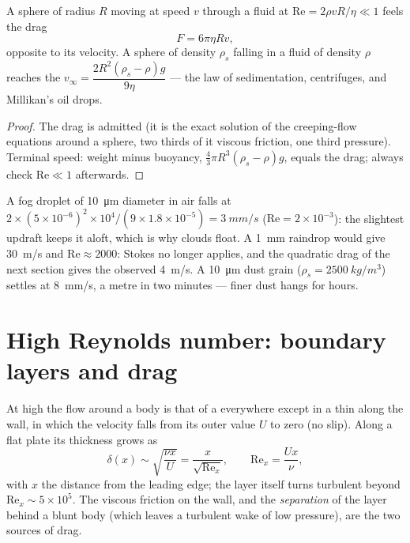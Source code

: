 \begin{proposition}\label{prop:b2:viscous-flows:stokes}
A sphere of radius $R$ moving at speed $v$ through a fluid at
$\mathrm{Re} = 2\rho vR/\eta \ll 1$ feels the drag
\[
F = 6\pi\eta Rv ,
\]
opposite to its velocity. A sphere of density $\rho_s$ falling in a fluid
of density $\rho$ reaches the \emph{} $v_\infty =
\dfrac{2R^2(\rho_s - \rho)g}{9\eta}$ --- the law of sedimentation,
centrifuges, and Millikan's oil drops.
\end{proposition}

\begin{proof}
The drag is admitted (it is the exact solution of the creeping-flow
equations around a sphere, two thirds of it viscous friction, one third
pressure). Terminal speed: weight minus buoyancy, $\tfrac43\pi R^3(\rho_s -
\rho)g$, equals the drag; always check $\mathrm{Re} \ll 1$ afterwards.
\end{proof}

\begin{example}\label{ex:b2:viscous-flows:fog}
A fog droplet of \qty{10}{\micro m} diameter in air falls at $2 \times (5 \times
10^{-6})^2 \times 10^4/(9 \times 1.8 \times 10^{-5}) = \qty{3}{mm/s}$ ($\mathrm{Re} = 2 \times
10^{-3}$): the slightest updraft keeps it aloft, which is why clouds
float. A \qty{1}{mm} raindrop would give \qty{30}{m/s} and $\mathrm{Re} \approx 2000$:
Stokes no longer applies, and the quadratic drag of the next section
gives the observed \qty{4}{m/s}. A \qty{10}{\micro m} dust grain ($\rho_s =
\qty{2500}{kg/m^3}$) settles at \qty{8}{mm/s}, a metre in two minutes ---
finer dust hangs for hours.
\end{example}

\section{High Reynolds number: boundary layers and drag}

\begin{proposition}\label{prop:b2:viscous-flows:bl}
At high  the flow around a body is that of a  everywhere except in a thin \emph{} along the wall,
in which the velocity falls from its outer value $U$ to zero (no slip).
Along a flat plate its thickness grows as
\[
\delta(x) \sim \sqrt{\frac{\nu x}{U}} = \frac{x}{\sqrt{\mathrm{Re}_x}} ,
\qquad \mathrm{Re}_x = \frac{Ux}{\nu} ,
\]
with $x$ the distance from the leading edge; the layer itself turns
turbulent beyond $\mathrm{Re}_x \sim 5 \times 10^5$. The viscous friction on the
wall, and the \emph{separation} of the layer behind a blunt body (which
leaves a turbulent wake of low pressure), are the two sources of drag.
\end{proposition}

